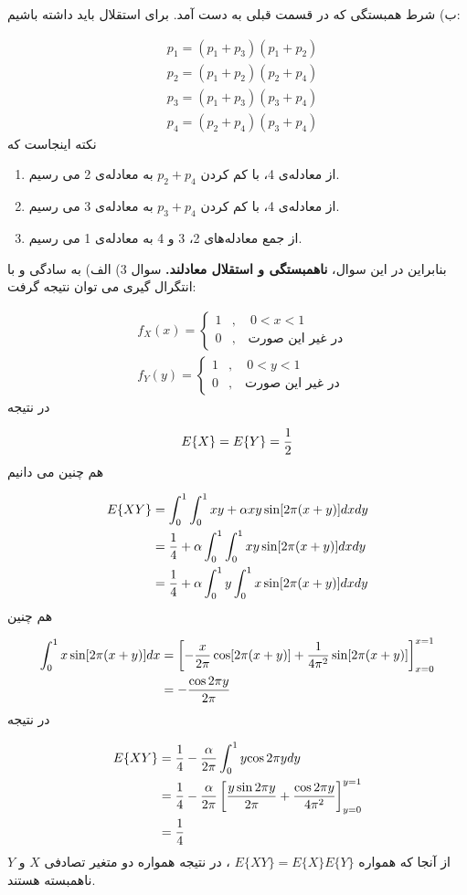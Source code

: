 \documentclass[10pt,letterpaper]{report}
\newcommand{\eqn}[1]{
\[\begin{split}
#1
\end{split}\]
}
\begin{document}
ب) شرط همبستگی که در قسمت قبلی به دست آمد. برای استقلال باید داشته باشیم:
\eqn{
&p_1=(p_1+p_3)(p_1+p_2)
\\&p_2=(p_1+p_2)(p_2+p_4)
\\&p_3=(p_1+p_3)(p_3+p_4)
\\&p_4=(p_2+p_4)(p_3+p_4)
}{}
نکته اینجاست که
\begin{enumerate}
\item
از معادله‌ی 4، با کم کردن 
$
p_2+p_4
$
 به معادله‌ی 2 می رسیم.
\item
از معادله‌ی 4، با کم کردن 
$
p_3+p_4
$
 به معادله‌ی 3 می رسیم.
\item
از جمع معادله‌های 2، 3 و 4 به معادله‌ی 1 می رسیم.
\end{enumerate}
بنابراین در این سوال، 
\textbf{
ناهمبستگی و استقلال معادلند.
}
\newline\newline
سوال 3) الف) به سادگی و با انتگرال گیری می توان نتیجه گرفت:
\eqn{
&f_X(x)=\begin{cases}
1&,\quad 0<x<1
\\0&,\quad \text{در غیر این صورت}
\end{cases}
\\&f_Y(y)=\begin{cases}
1&,\quad 0<y<1
\\0&,\quad \text{در غیر این صورت}
\end{cases}
}{}
در نتیجه
\eqn{
E\{X\}=E\{Y\}={1\over 2}
}{}
هم چنین می دانیم
\eqn{
E\{XY\}&=\int_0^1\int_0^1 xy+\alpha xy\sin[2\pi(x+y)]dxdy
\\&={1\over 4}+\alpha\int_0^1\int_0^1 xy\sin[2\pi(x+y)]dxdy
\\&={1\over 4}+\alpha\int_0^1y\int_0^1 x\sin[2\pi(x+y)]dxdy
}{}
هم چنین
\eqn{
\int_0^1 x\sin[2\pi(x+y)]dx&=\left[-{x\over 2\pi}\cos[2\pi(x+y)]+{1\over 4\pi^2}\sin[2\pi(x+y)]\right]_{x=0}^{x=1}
\\&=-{\cos 2\pi y\over 2\pi}
}{}
در نتیجه
\eqn{
E\{XY\}&=
{1\over 4}-{\alpha\over 2\pi}\int_0^1y{\cos 2\pi y}dy
\\&={1\over 4}-{\alpha\over 2\pi}\left[{y\sin 2\pi y\over 2\pi}+{\cos 2\pi y\over 4\pi^2}\right]_{y=0}^{y=1}
\\&={1\over 4}
}{}
از آنجا که همواره 
$
E\{XY\}=E\{X\}E\{Y\}
$
، در نتیجه همواره دو متغیر تصادفی $X$ و $Y$ ناهمبسته هستند.
\end{document}
